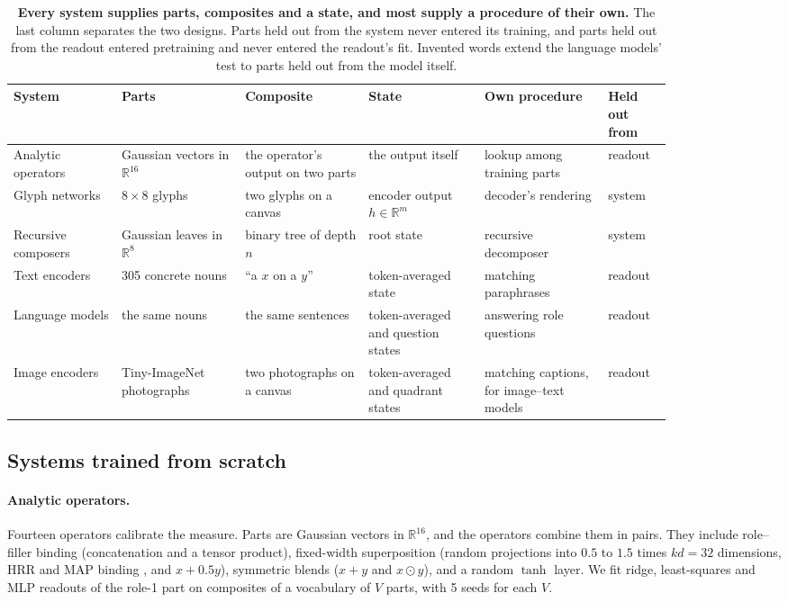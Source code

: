 \documentclass[10pt]{article}
\theoremstyle{plain}
\theoremstyle{remark}
\newcommand{\R}{\mathbb{R}}
\begin{document}
\begin{table}[t]
  \centering
  \small
  \caption{\textbf{Every system supplies parts, composites and a state, and most supply a procedure of their own.} The last column separates the two designs. Parts held out from the system never entered its training, and parts held out from the readout entered pretraining and never entered the readout's fit. Invented words extend the language models' test to parts held out from the model itself.}
  \label{tab:systems}
  \begin{tabular}{@{}p{0.14\linewidth}p{0.16\linewidth}p{0.16\linewidth}p{0.15\linewidth}p{0.16\linewidth}p{0.08\linewidth}@{}}
    \toprule
    System & Parts & Composite & State & Own procedure & Held out from \\
    \midrule
    Analytic operators & Gaussian vectors in $\R^{16}$ & the operator's output on two parts & the output itself & lookup among training parts & readout \\
    Glyph networks & $8 \times 8$ glyphs & two glyphs on a canvas & encoder output $h \in \R^m$ & decoder's rendering & system \\
    Recursive composers & Gaussian leaves in $\R^8$ & binary tree of depth $n$ & root state & recursive decomposer & system \\
    Text encoders & 305 concrete nouns & ``a $x$ on a $y$'' & token-averaged state & matching paraphrases & readout \\
    Language models & the same nouns & the same sentences & token-averaged and question states & answering role questions & readout \\
    Image encoders & Tiny-ImageNet photographs & two photographs on a canvas & token-averaged and quadrant states & matching captions, for image--text models & readout \\
    \bottomrule
  \end{tabular}
\end{table}

\subsection{Systems trained from scratch}
\label{sec:design_scratch}

\paragraph{Analytic operators.} Fourteen operators calibrate the measure. Parts are Gaussian vectors in $\R^{16}$, and the operators combine them in pairs. They include role--filler binding (concatenation and a tensor product), fixed-width superposition (random projections into $0.5$ to $1.5$ times $kd = 32$ dimensions, HRR and MAP binding \citep{plate1995,gayler2006,kanerva2009}, and $x + 0.5y$), symmetric blends ($x + y$ and $x \odot y$), and a random $\tanh$ layer. We fit ridge, least-squares and MLP readouts of the role-1 part on composites of a vocabulary of $V$ parts, with 5 seeds for each $V$.
\end{document}
